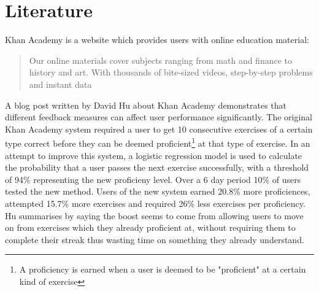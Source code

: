 \section{Literature}
Khan Academy\cite{khan_site} is a website which provides users with online education material:
\begin{quote}
Our online materials cover subjects ranging from math and finance to history and art.  With thousands of bite-sized videos, step-by-step problems and instant data\cite{ka_faq}
\end{quote}
A blog post\cite{khan_blog} written by David Hu about Khan Academy demonstrates that different feedback measures can affect user performance significantly. The original Khan Academy system required a user to get 10 consecutive exercises of a certain type correct before they can be deemed proficient\footnote{A proficiency is earned when a user is deemed to be "proficient" at a certain kind of exercise} at that type of exercise. In an attempt to improve this system, a logistic regression model is used to calculate the probability that a user passes the next exercise successfully, with a threshold of 94\% representing the new proficieny level. Over a 6 day period 10\% of users tested the new method. Users of the new system earned 20.8\% more proficiences, attempted 15.7\% more exercises and required 26\% less exercises per proficiency. Hu summarises by saying the boost seems to come from allowing users to move on from exercises which they already proficient at, without requiring them to complete their streak thus wasting time on something they already understand.
